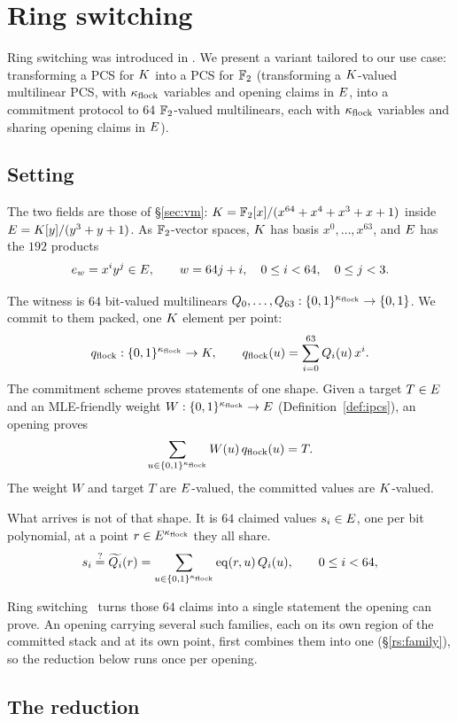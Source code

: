 \section{Ring switching}\label{annex:rs}

Ring switching was introduced in \cite{DP24}. We present a variant tailored to our use case: transforming a PCS for $K$ into a PCS for $\mathbb{F}_2$ (transforming a $K$-valued multilinear PCS, with $\kappa_{\mathrm{flock}}$ variables and opening claims in $E$, into a commitment protocol to 64 $\mathbb{F}_2$-valued multilinears, each with $\kappa_{\mathrm{flock}}$ variables and sharing opening claims in $E$).

\subsection{Setting}\label{rs:setting}

The two fields are those of \S\ref{sec:vm}: $K=\mathbb{F}_2[x]/(x^{64}+x^4+x^3+x+1)$ inside $E=K[y]/(y^3+y+1)$. As $\mathbb{F}_2$-vector spaces, $K$ has basis $x^0,\dots,x^{63}$, and $E$ has the $192$ products
\[
e_w=x^iy^j\in E,\qquad w=64j+i,\quad 0\le i<64,\quad 0\le j<3.
\]

The witness is $64$ bit-valued multilinears $Q_0,\dots,Q_{63}:\{0,1\}^{\kappa_{\mathrm{flock}}}\to\{0,1\}$. We commit to them packed, one $K$ element per point:
\[
q_{\mathrm{flock}}:\{0,1\}^{\kappa_{\mathrm{flock}}}\to K,\qquad q_{\mathrm{flock}}(u)=\sum_{i=0}^{63}Q_i(u)\,x^i.
\]
The commitment scheme proves statements of one shape. Given a target $T\in E$ and an MLE-friendly weight $W:\{0,1\}^{\kappa_{\mathrm{flock}}}\to E$ (Definition~\ref{def:ipcs}), an opening proves
\[
\sum_{u\in\{0,1\}^{\kappa_{\mathrm{flock}}}}W(u)\,q_{\mathrm{flock}}(u)=T.
\]
The weight $W$ and target $T$ are $E$-valued, the committed values are $K$-valued.

What arrives is not of that shape. It is $64$ claimed values $s_i\in E$, one per bit polynomial, at a point $r\in E^{\kappa_{\mathrm{flock}}}$ they all share.
\[
s_i \stackrel{?}{=} \widetilde{Q_i}(r)=\sum_{u\in\{0,1\}^{\kappa_{\mathrm{flock}}}}\operatorname{eq}(r,u)\,Q_i(u),\qquad 0\le i<64,
\]

Ring switching~\cite{DP24} turns those $64$ claims into a single statement the opening can prove. An opening carrying several such families, each on its own region of the committed stack and at its own point, first combines them into one (\S\ref{rs:family}), so the reduction below runs once per opening.

\subsection{The reduction}\label{rs:reduction}

